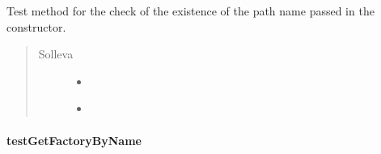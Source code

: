 \documentclass[letterpaper,10pt,italian,openany,oneside]{sphinxmanual}
\begin{document}
\begin{fulllineitems}
\label{\detokenize{test/it/unicam/cs/pa/mastermind/test/PlayersFactoryRegistry:it.unicam.cs.pa.mastermind.test.PlayersFactoryRegistry.testCheckRightPathName()}}
Test method for the check of the existence of the path name passed in the constructor.
\begin{quote}\begin{description}
\item[{Solleva}] \leavevmode\begin{itemize}
\item {} 
{\hyperref[\detokenize{source/it/unicam/cs/pa/mastermind/players/BadRegistryException:it.unicam.cs.pa.mastermind.players.BadRegistryException}]{}} \textendash{} 

\item {} 
 \textendash{} 

\end{itemize}

\end{description}\end{quote}

\end{fulllineitems}



\paragraph{testGetFactoryByName}
\label{\detokenize{test/it/unicam/cs/pa/mastermind/test/PlayersFactoryRegistry:testgetfactorybyname}}
\end{document}
